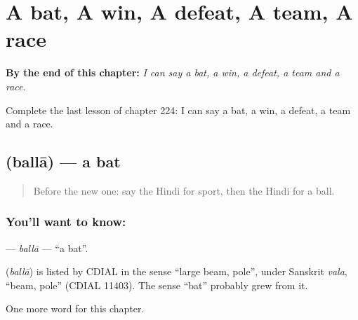 
\chapter{A bat, A win, A defeat, A team, A race}
\label{ch:hi-a-bat-a-win-a-defeat-a-team-a-race}

\begin{chapteropening}
\textbf{By the end of this chapter:} \emph{I can say a bat, a win, a defeat, a team and a race.}

Complete the last lesson of chapter 224: I can say a bat, a win, a defeat, a team and a race.
\end{chapteropening}

\section[\texorpdfstring{\hi{बल्ला} (ballā)}{बल्ला (ballā)}]{ (ballā) — a bat}

\label{lesson:HI-C224-balla}



\begin{quote}
Before the new one: say the Hindi for sport, then the Hindi for a ball.
\end{quote}

\subsection*{You'll want to know: }
\textbf{} — \emph{ballā} — \textquotedblleft{}a bat\textquotedblright{}.

\begin{cousinweb}
\textbf{} (\emph{ballā}) is listed by CDIAL in the sense \textquotedblleft{}large beam, pole\textquotedblright{}, under Sanskrit \emph{vala}, \textquotedblleft{}beam, pole\textquotedblright{} (CDIAL 11403). The sense \textquotedblleft{}bat\textquotedblright{} probably grew from it.
\end{cousinweb}

\begin{grammarlens}[title={What you've built}]
One more word for this chapter.
\end{grammarlens}

